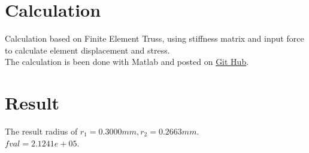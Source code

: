 \documentclass{article}
\begin{document}
\section{Calculation}
Calculation based on Finite Element Truss, using stiffness matrix and input force to calculate element displacement and stress. \\
The calculation is been done with Matlab and posted on \href{https://github.com/dchsieh/Ten-bar-truss-optimization.git}{Git Hub}.

\section{Result}
The result radius of $ r_1 = 0.3000 mm , r_2 = 0.2663 mm. $\\
$ fval = 2.1241e+05 $.
\end{document}
